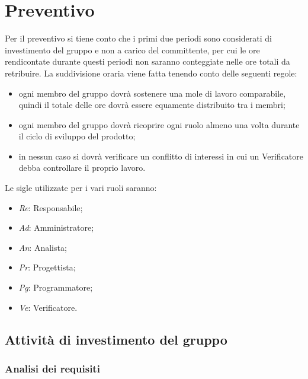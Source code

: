 \newpage
\section{Preventivo}

Per il preventivo si tiene conto che i primi due periodi sono considerati di investimento del gruppo e non a carico del committente, per cui le ore rendicontate durante questi periodi non saranno conteggiate nelle ore totali da retribuire.
La suddivisione oraria viene fatta tenendo conto delle seguenti regole:
\begin{itemize}
	\item ogni membro del gruppo dovrà sostenere una mole di lavoro comparabile, quindi il totale delle ore dovrà essere equamente distribuito tra i membri;
	\item ogni membro del gruppo dovrà ricoprire ogni ruolo almeno una volta durante il ciclo di sviluppo del prodotto;
	\item in nessun caso si dovrà verificare un conflitto di interessi in cui un Verificatore debba	controllare il proprio lavoro.
\end{itemize}
Le sigle utilizzate per i vari ruoli saranno:
\begin{itemize}
	\item \emph{Re}: Responsabile;
	\item \emph{Ad}: Amministratore;
	\item \emph{An}: Analista;
	\item \emph{Pr}: Progettista;
	\item \emph{Pg}: Programmatore;
	\item \emph{Ve}: Verificatore.
\end{itemize}

\subsection{Attività di investimento del gruppo}
\subsubsection{Analisi dei requisiti}
